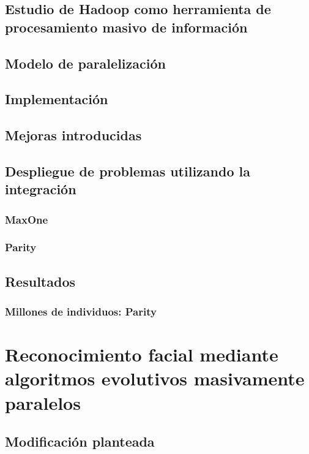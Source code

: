 \documentclass{estilos-y-libreria}
\begin{document}
	\section{Estudio de Hadoop como herramienta de procesamiento masivo de informaci\'on	\label{desarrollo-hadoop}}
		
	\section{Modelo de paralelizaci\'on}
		
	\section{Implementaci\'on}
		
	\section{Mejoras introducidas}
		
	\section{Despliegue de problemas utilizando la integraci\'on}
		
		\subsection{MaxOne}
			
		\subsection{Parity}
			
	\section{Resultados}
			
		\subsection{Millones de individuos: Parity}
				
			
\chapter{Reconocimiento facial mediante algoritmos evolutivos masivamente paralelos}\label{facerecognition}
	
	\section{Modificación planteada}
		
\end{document}
